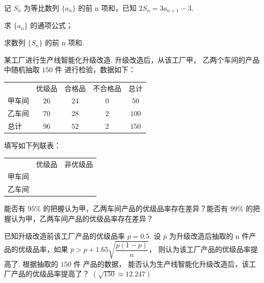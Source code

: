\documentclass[UTF8,12pt]{ctexart}
\begin{document}
\begin{questions}[start=17]

  \item 记 $S_n$ 为等比数列 $\{a_n\}$ 的前 n 项和，已知 $2S_n=3a_{n+1}-3$.

    \begin{subquestions}
      \item
      求 $\{a_n\}$ 的通项公式；
      \item
      求数列 $\{S_n\}$ 的前 n 项和.
    \end{subquestions}

  \item 某工厂进行生产线智能化升级改造. 升级改造后，从该工厂甲，
    乙两个车间的产品中随机抽取 $150\text{ 件}$ 进行检验，数据如下：

    \begin{center}
      \begin{tabular}{lcccc}
        \toprule
               & 优级品 & 合格品 & 不合格品 & 总计 \\
        甲车间 & $26$   & $24$   & $0$      & $50$ \\
        乙车间 & $70$   & $28$   & $2$      & $100$ \\
        总计   & $96$   & $52$   & $2$      & $150$ \\
        \bottomrule
      \end{tabular}
    \end{center}

    \begin{subquestions}
      \item
      填写如下列联表：

        \begin{center}
          \begin{tabular}{lcc}
            \toprule
                   & 优级品 & 非优级品 \\
            甲车间 &        &  \\
            乙车间 &        &  \\
            \bottomrule
          \end{tabular}
        \end{center}

      能否有 $95\%$ 的把握认为甲，乙两车间产品的优级品率存在差异？能否有 $99\%$
        的把握认为甲，乙两车间产品的优级品率存在差异？
      \item
      已知升级改造前该工厂产品的优级品率 $p=0.5$. 设 $\bar p$ 为升级改造后抽取的 n
        件产品的优级品率，如果 $\bar p>p+1.65\sqrt{\dfrac{p(1-p)}{n}}$，
        则认为该工厂产品的优级品率提高了. 根据抽取的 $150\text{ 件}$ 产品的数据，
        能否认为生产线智能化升级改造后，该工厂产品的优级品率提高了？%
        $(\sqrt{150}\approx12.247)$
    \end{subquestions}


\end{questions}
\end{document}
